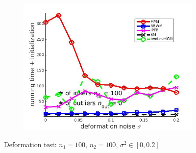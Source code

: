 \documentclass[
	fontsize=12pt,
	paper=a4,
	twoside=false,
	numbers=noenddot,
	plainheadsepline,
	toc=listof,
	toc=bibliography
]{scrartcl}
\begin{document}
\begin{figure}[h]
\begin{subfigure}[b]{0.3\textwidth}
	\end{subfigure} 
	\begin{subfigure}[b]{0.3\textwidth}
		\centering
		\includegraphics[scale=0.25]{"fig_ver2608/syntheticPointSets/ver4.2.1/deformation/time_summary_avg10t"} 
	\end{subfigure} 	
	\caption{Deformation test: $n_1=100$, $n_2=100$, $\sigma^2\in[0, 0.2]$}
	\label{fig:test1_ver421}
\end{figure}

\FloatBarrier	
\end{document}
